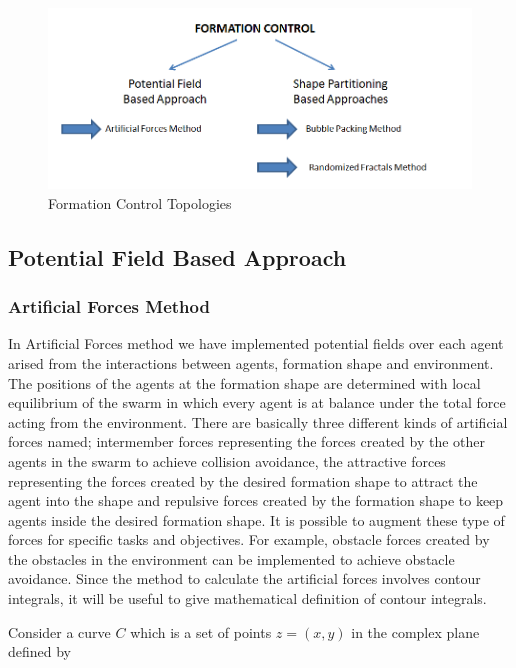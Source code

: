 \begin{figure}[H]
\caption{Formation Control Topologies} \label{formation_controlin_figi}
\centering
\includegraphics[scale = 0.60]{methods}
\end{figure}		
		
\subsection{Potential Field Based Approach}

\subsubsection{Artificial Forces Method} \label{Artificial Forces Ref} \label{Artificial_forces_ref}
In Artificial Forces method we have implemented potential fields over each agent arised from the interactions between agents, formation shape and environment. The positions of the agents at the formation shape  are determined with local equilibrium of the swarm in which every agent is at balance under the total force acting from the environment. There are basically three different kinds of artificial forces named; intermember forces representing the forces created by the other agents in the swarm to achieve collision avoidance, the attractive forces representing the forces created by the desired formation shape to attract the agent into the shape and repulsive forces created by the formation shape to keep agents inside the desired formation shape. It is possible to augment these type of forces for specific tasks and objectives. For example, obstacle forces created by the obstacles in the environment can be implemented to achieve obstacle avoidance. Since the method to calculate the artificial forces involves contour integrals, it will be useful to give mathematical definition of contour integrals.
		
Consider a curve $C$ which is a set of points $z = (x,y)$ in the complex plane defined by \cite{wiki_contour}


